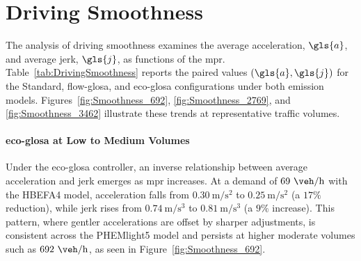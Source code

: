 \section{Driving Smoothness}
\label{sec:Results_Smoothness}

The analysis of driving smoothness examines the average acceleration, $\gls{a}$, and average jerk, $\gls{j}$, as functions of the \ac{mpr}. Table~\vref{tab:DrivingSmoothness} reports the paired values $(\gls{a}, \gls{j})$ for the Standard, \ac{flow-glosa}, and \ac{eco-glosa} configurations under both emission models. Figures~\vref{fig:Smoothness_692}, \vref{fig:Smoothness_2769}, and \vref{fig:Smoothness_3462} illustrate these trends at representative traffic volumes.

\paragraph{\ac{eco-glosa} at Low to Medium Volumes}
Under the \ac{eco-glosa} controller, an inverse relationship between average acceleration and jerk emerges as \ac{mpr} increases. At a demand of $69~\unit{\veh\per\hour}$ with the HBEFA4 model, acceleration falls from $0.30~\unit{\metre\per\second\squared}$ to $0.25~\unit{\metre\per\second\squared}$ (a $17\%$ reduction), while jerk rises from $0.74~\unit{\metre\per\second\cubed}$ to $0.81~\unit{\metre\per\second\cubed}$ (a $9\%$ increase). This pattern, where gentler accelerations are offset by sharper adjustments, is consistent across the PHEMlight5 model and persists at higher moderate volumes such as $692~\unit{\veh\per\hour}$, as seen in Figure~\vref{fig:Smoothness_692}.


